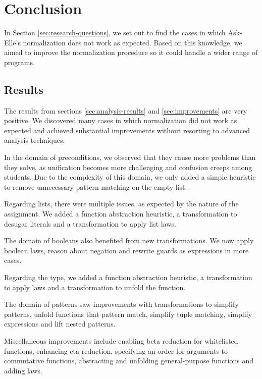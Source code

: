 \chapter{Conclusion}
\label{sec:conclusion}

In Section \ref{sec:research-questions}, we set out to find the cases in which Ask-Elle's normalization does not work as expected. Based on this knowledge, we aimed to improve the normalization procedure so it could handle a wider range of programs.

\section{Results}

The results from sections \ref{sec:analysis-results} and \ref{sec:improvements} are very positive. We discovered many cases in which normalization did not work as expected and achieved substantial improvements without resorting to advanced analysis techniques.

In the domain of preconditions, we observed that they cause more problems than they solve, as unification becomes more challenging and confusion creeps among students. Due to the complexity of this domain, we only added a simple heuristic to remove unnecessary pattern matching on the empty list.

Regarding lists, there were multiple issues, as expected by the nature of the assignment. We added a function abstraction heuristic, a transformation to desugar literals and a transformation to apply list laws.

The domain of booleans also benefited from new transformations. We now apply boolean laws, reason about negation and rewrite guards as  expressions in more cases.

Regarding the  type, we added a function abstraction heuristic, a transformation to apply  laws and a transformation to unfold the  function.

The domain of patterns saw improvements with transformations to simplify patterns, unfold functions that pattern match, simplify tuple matching, simplify  expressions and lift nested patterns.

Miscellaneous improvements include enabling beta reduction for whitelisted functions, enhancing eta reduction, specifying an order for arguments to commutative functions, abstracting and unfolding general-purpose functions and adding  laws.

